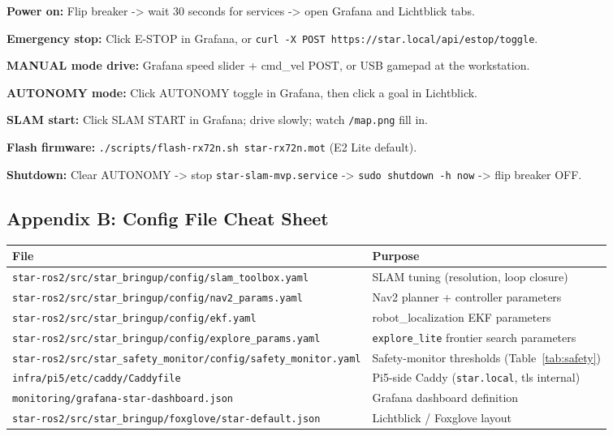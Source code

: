 \documentclass[11pt,letterpaper]{article}
\begin{document}
\textbf{Power on:} Flip breaker -> wait 30 seconds for services -> open
Grafana and Lichtblick tabs.

\textbf{Emergency stop:} Click E-STOP in Grafana, or
\texttt{curl -X POST https://star.local/api/estop/toggle}.

\textbf{MANUAL mode drive:} Grafana speed slider + cmd\_vel POST, or
USB gamepad at the workstation.

\textbf{AUTONOMY mode:} Click AUTONOMY toggle in Grafana, then click
a goal in Lichtblick.

\textbf{SLAM start:} Click SLAM START in Grafana; drive slowly; watch
\texttt{/map.png} fill in.

\textbf{Flash firmware:}
\texttt{./scripts/flash-rx72n.sh star-rx72n.mot} (E2 Lite default).

\textbf{Shutdown:} Clear AUTONOMY -> stop
\texttt{star-slam-mvp.service} -> \texttt{sudo shutdown -h now} ->
flip breaker OFF.

\subsection*{Appendix B: Config File Cheat Sheet}

\begin{table}[H]
\centering
\small
\begin{tabularx}{\linewidth}{l X}
\toprule
\textbf{File} & \textbf{Purpose} \\
\midrule
\texttt{star-ros2/src/star\_bringup/config/slam\_toolbox.yaml}
    & SLAM tuning (resolution, loop closure) \\
\texttt{star-ros2/src/star\_bringup/config/nav2\_params.yaml}
    & Nav2 planner + controller parameters \\
\texttt{star-ros2/src/star\_bringup/config/ekf.yaml}
    & robot\_localization EKF parameters \\
\texttt{star-ros2/src/star\_bringup/config/explore\_params.yaml}
    & \texttt{explore\_lite} frontier search parameters \\
\texttt{star-ros2/src/star\_safety\_monitor/config/safety\_monitor.yaml}
    & Safety-monitor thresholds (Table~\ref{tab:safety}) \\
\texttt{infra/pi5/etc/caddy/Caddyfile}
    & Pi5-side Caddy (\texttt{star.local}, tls internal) \\
\texttt{monitoring/grafana-star-dashboard.json}
    & Grafana dashboard definition \\
\texttt{star-ros2/src/star\_bringup/foxglove/star-default.json}
    & Lichtblick / Foxglove layout \\
\bottomrule
\end{tabularx}
\end{table}
\end{document}
